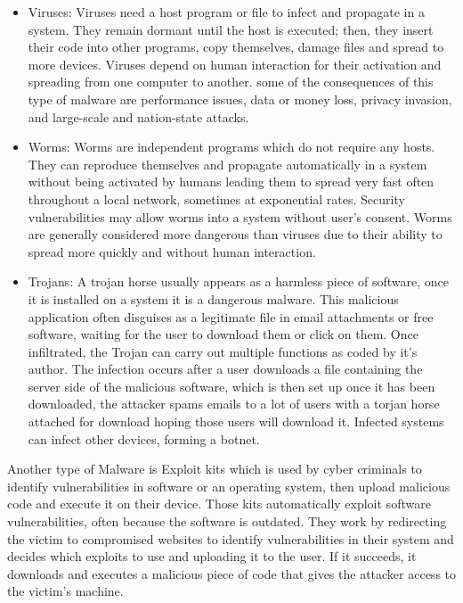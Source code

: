 	\begin{itemize}
	\item Viruses: Viruses need a host program or file to infect and propagate in a system. They remain dormant until the host is executed; then, they insert their code into other programs, copy themselves, damage files and spread to more devices. Viruses depend on human interaction for their activation and spreading from one computer to another. some of the consequences of this type of malware are performance issues, data or money loss, privacy invasion, and large-scale and nation-state attacks. \cite{virusVSworm}
	\item Worms: Worms are independent programs which do not require any hosts. They can reproduce themselves and propagate automatically in a system without being activated by humans leading them to spread very fast often throughout a local network, sometimes at exponential rates. Security vulnerabilities may allow worms into a system without user's consent. Worms are generally considered more dangerous than viruses due to their ability to spread more quickly and without human interaction.\cite{virusVSworm}
	\item Trojans: A trojan horse usually appears as a harmless piece of software, once it is installed on a system it is a  dangerous malware. This malicious application often disguises as a legitimate file in email attachments or free software, waiting for the user to download them or click on them. Once infiltrated, the Trojan can carry out multiple functions as coded by it's author. The infection occurs after a user downloads a file containing the server side of the malicious software, which is then set up once it has been downloaded, the attacker spams emails to a lot of users with a torjan horse attached for download hoping those users will download it. Infected systems can infect other devices, forming a botnet.\cite{torjanhorse}
	\end{itemize}

Another type of Malware is Exploit kits which is used by cyber criminals to identify vulnerabilities in software or an operating system, then upload malicious code and execute it on their device. Those kits automatically exploit software vulnerabilities, often because the software is outdated. They work by redirecting the victim to compromised websites to identify vulnerabilities in their system and decides which exploits to use and uploading it to the user. If it succeeds, it downloads and executes a malicious piece of code that gives the attacker access to the victim's machine. \cite{exploit-kit}

